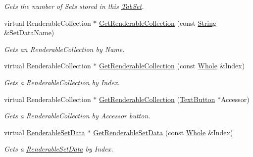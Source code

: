 \begin{DoxyCompactItemize}
\begin{DoxyCompactList}\small\item\em Gets the number of Sets stored in this \hyperlink{classMezzanine_1_1UI_1_1TabSet}{TabSet}. \item\end{DoxyCompactList}\item 
virtual RenderableCollection $\ast$ \hyperlink{classMezzanine_1_1UI_1_1TabSet_a44e57083881081eacfe86e2cf238fbc1}{GetRenderableCollection} (const \hyperlink{namespaceMezzanine_acf9fcc130e6ebf08e3d8491aebcf1c86}{String} \&SetDataName)
\begin{DoxyCompactList}\small\item\em Gets an RenderableCollection by Name. \item\end{DoxyCompactList}\item 
virtual RenderableCollection $\ast$ \hyperlink{classMezzanine_1_1UI_1_1TabSet_ad0ae1d3d1f180e4a4df5f590b98f1055}{GetRenderableCollection} (const \hyperlink{namespaceMezzanine_adcbb6ce6d1eb4379d109e51171e2e493}{Whole} \&Index)
\begin{DoxyCompactList}\small\item\em Gets a RenderableCollection by Index. \item\end{DoxyCompactList}\item 
virtual RenderableCollection $\ast$ \hyperlink{classMezzanine_1_1UI_1_1TabSet_a50e0f42e0400ea33dfb67a39bd296ed4}{GetRenderableCollection} (\hyperlink{classMezzanine_1_1UI_1_1TextButton}{TextButton} $\ast$Accessor)
\begin{DoxyCompactList}\small\item\em Gets a RenderableCollection by Accessor button. \item\end{DoxyCompactList}\item 
virtual \hyperlink{structMezzanine_1_1UI_1_1RenderableSetData}{RenderableSetData} $\ast$ \hyperlink{classMezzanine_1_1UI_1_1TabSet_adbefc53cf485e2d4c937c9f08c13958e}{GetRenderableSetData} (const \hyperlink{namespaceMezzanine_adcbb6ce6d1eb4379d109e51171e2e493}{Whole} \&Index)
\begin{DoxyCompactList}\small\item\em Gets a \hyperlink{structMezzanine_1_1UI_1_1RenderableSetData}{RenderableSetData} by Index. \item\end{DoxyCompactList}\item 

\end{DoxyCompactItemize}
